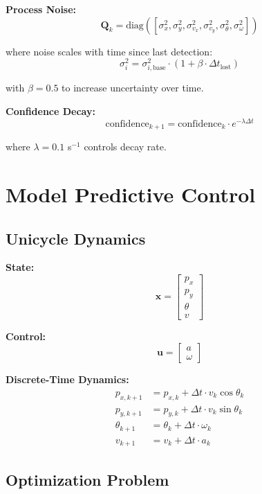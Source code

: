 \documentclass[11pt]{article}
\begin{document}
\textbf{Process Noise:}
\[
\mathbf{Q}_k = \text{diag}([\sigma_x^2, \sigma_y^2, \sigma_{v_x}^2, \sigma_{v_y}^2, \sigma_{\theta}^2, \sigma_{\omega}^2])
\]

where noise scales with time since last detection:
\[
\sigma_i^2 = \sigma_{i,\text{base}}^2 \cdot (1 + \beta \cdot \Delta t_{\text{lost}})
\]

with $\beta = 0.5$ to increase uncertainty over time.

\textbf{Confidence Decay:}
\[
\text{confidence}_{k+1} = \text{confidence}_k \cdot e^{-\lambda \Delta t}
\]

where $\lambda = 0.1$ s$^{-1}$ controls decay rate.

\section{Model Predictive Control}

\subsection{Unicycle Dynamics}

\textbf{State:}
\[
\mathbf{x} = \begin{bmatrix} p_x \\ p_y \\ \theta \\ v \end{bmatrix}
\]

\textbf{Control:}
\[
\mathbf{u} = \begin{bmatrix} a \\ \omega \end{bmatrix}
\]

\textbf{Discrete-Time Dynamics:}
\begin{align}
p_{x,k+1} &= p_{x,k} + \Delta t \cdot v_k \cos\theta_k \\
p_{y,k+1} &= p_{y,k} + \Delta t \cdot v_k \sin\theta_k \\
\theta_{k+1} &= \theta_k + \Delta t \cdot \omega_k \\
v_{k+1} &= v_k + \Delta t \cdot a_k
\end{align}

\subsection{Optimization Problem}
\end{document}
